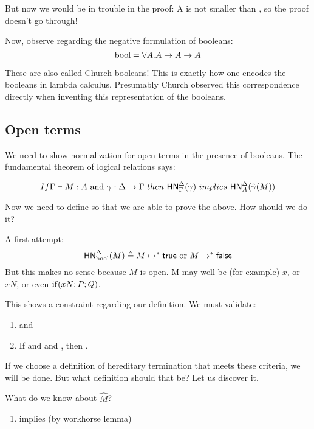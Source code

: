 \documentclass{article}
\begin{document}
But now we would be in trouble in the proof: A is not smaller than \booltype, so the proof doesn't go through!

Now, observe regarding the negative formulation of booleans:
\[
\text{bool} = \forall A . A \to A \to A
\]

These are also called Church booleans! This is exactly how one encodes the booleans in lambda calculus. Presumably Church observed this correspondence directly when inventing this representation of the booleans.

\subsection{Open terms}
We need to show normalization for open terms in the presence of booleans. The fundamental theorem of logical relations says:

\[
If \hasEF{\Gamma}{M}{A} \ \text{and} \ \gamma : \Delta \to \Gamma \ then \  \hnorm{\Delta}{\Gamma}{\gamma} \ implies \ \hnorm{\Delta}{A}{\hat\gamma(M)}
\]

Now we need to define  so that we are able to prove the above. How should we do it?

A first attempt:
\[
\mathsf{HN}^{\Delta}_{\text{bool}}(M) \triangleq M \mapsto^* \mathsf{true} \ \text{or} \ M \mapsto^* \mathsf{false}
\]
But this makes no sense because $M$ is open. M may well be (for example) $x$, or $x N$, or even $\mathrm{if}(x N; P; Q)$.

This shows a constraint regarding our definition. We must validate:
\begin{lemma}
\leavevmode
\label{ht-prods}
\begin{enumerate}
\item \hnorm{\Delta}{\booltype}{\true} and \hnorm{\Delta}{\booltype}{\false}
\item If  and  and , then .
\end{enumerate}
\end{lemma}

If we choose a definition of hereditary termination that meets these criteria, we will be done. But what definition should that be? Let us discover it.

What do we know about $\hat M$?

\begin{enumerate}
\item {} implies  (by workhorse lemma)
\end{enumerate}
\end{document}
